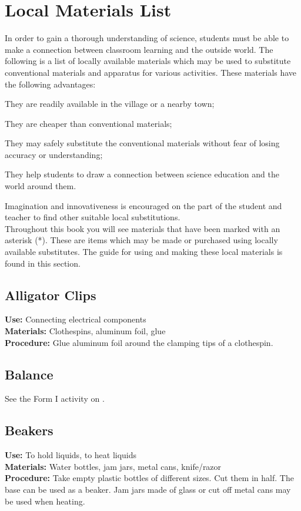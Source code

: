 \chapter{Local Materials List}
\label{cha:local-materials}

In order to gain a thorough understanding of science, students must be able to make a connection between classroom learning and the outside world. The following is a list of locally available materials which may be used to substitute conventional materials and apparatus for various activities. These materials have the following advantages: 
\begin{itemize*}
\item They are readily available in the village or a nearby town;
\item They are cheaper than conventional materials; 
\item They may safely substitute the conventional materials without fear of losing accuracy or understanding; 
\item They help students to draw a connection between science education and the world around them.
\end{itemize*}
Imagination and innovativeness is encouraged on the part of the student and teacher to find other suitable local substitutions. \\

\noindent Throughout this book you will see materials that have been marked with an asterisk (*). These are items which may be made or purchased using locally available substitutes. The guide for using and making these local materials is found in this section.  

\section*{Alligator Clips}
\vspace{-10pt}
\textbf{Use:} Connecting electrical components\\
\textbf{Materials:} Clothespins, aluminum foil, glue\\
\textbf{Procedure:} Glue aluminum foil around the clamping tips of a clothespin.

\section*{Balance}
\vspace{-10pt}
See the Form I activity on .

\section*{Beakers}
\vspace{-10pt}
\textbf{Use:} To hold liquids, to heat liquids\\
\textbf{Materials:} Water bottles, jam jars, metal cans, knife\slash razor\\
\textbf{Procedure:} Take empty plastic bottles of different sizes. Cut them in half. The base can be used as a beaker. Jam jars made of glass or cut off metal cans may be used when heating. 

